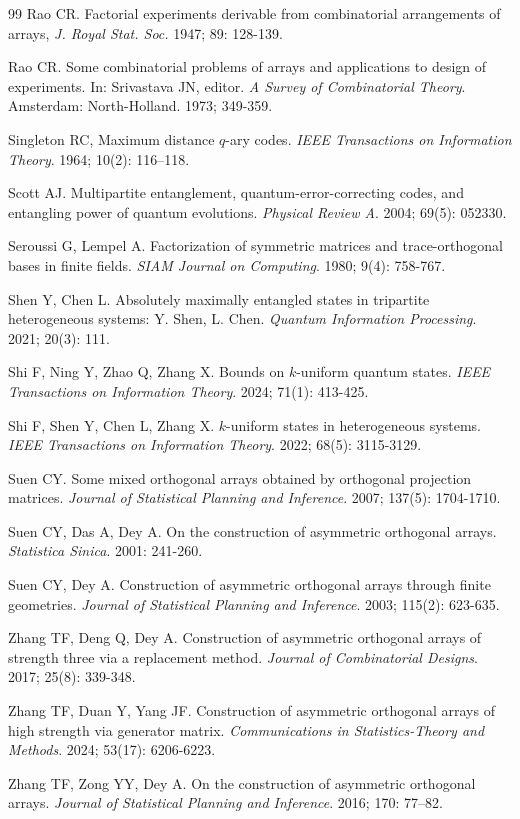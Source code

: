 \documentclass[11pt]{article}
\newtheorem{Definition and Notation}[Theorem]{Definition and Notation}
\begin{document}
\begin{thebibliography}{99}
 Rao CR. Factorial experiments derivable from combinatorial arrangements of arrays,
\emph{J. Royal Stat. Soc.} 1947; 89: 128-139.

 Rao CR. Some combinatorial problems of arrays and applications to design of experiments. In: Srivastava JN, editor. {\it A Survey of Combinatorial Theory}. Amsterdam: North-Holland. 1973; 349-359.

 Singleton RC, Maximum distance $q$-ary codes. {\it IEEE Transactions on Information Theory}. 1964; 10(2): 116–118.

 Scott AJ. Multipartite entanglement, quantum-error-correcting codes, and entangling power of quantum evolutions. {\it Physical Review A}. 2004; 69(5): 052330.

 Seroussi G, Lempel A. Factorization of symmetric matrices and trace-orthogonal bases in finite fields. {\it SIAM Journal on Computing}. 1980; 9(4): 758-767.

 Shen Y, Chen L. Absolutely maximally entangled states in tripartite heterogeneous systems: Y. Shen, L. Chen. {\it Quantum Information Processing}. 2021; 20(3): 111.

 Shi F, Ning Y, Zhao Q, Zhang X. Bounds on $k$-uniform quantum states. {\it IEEE Transactions on Information Theory}. 2024; 71(1): 413-425.

 Shi F, Shen Y, Chen L, Zhang X. $k$-uniform states in heterogeneous systems. {\it IEEE Transactions on Information Theory}. 2022; 68(5): 3115-3129.

 Suen CY. Some mixed orthogonal arrays obtained by orthogonal projection matrices. {\it Journal of Statistical Planning and Inference}. 2007; 137(5): 1704-1710.


 Suen CY, Das A, Dey A. On the construction of asymmetric orthogonal arrays. {\it Statistica Sinica}. 2001: 241-260.

  Suen CY, Dey A. Construction of asymmetric orthogonal arrays through finite geometries. {\it Journal of Statistical Planning and Inference}. 2003; 115(2): 623-635.


 Zhang TF, Deng Q, Dey A. Construction of asymmetric orthogonal arrays of strength three via a replacement method. {\it Journal of Combinatorial Designs}. 2017; 25(8): 339-348.

 Zhang TF, Duan Y, Yang JF. Construction of asymmetric orthogonal arrays of high strength via generator matrix. {\it Communications in Statistics-Theory and Methods}. 2024; 53(17): 6206-6223.

 Zhang TF, Zong YY, Dey A. On the construction of asymmetric orthogonal arrays. {\it Journal of Statistical Planning and Inference}. 2016; 170: 77–82. 

\end{thebibliography}
\end{document}
